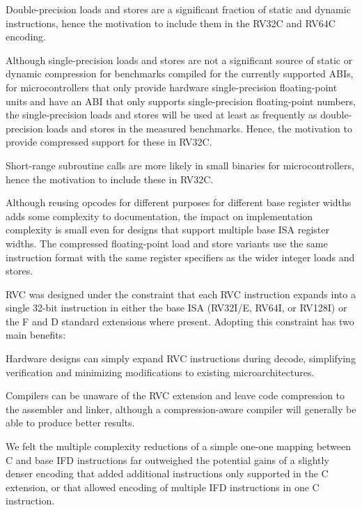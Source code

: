 \begin{commentary}
Double-precision loads and stores are a significant fraction of static
and dynamic instructions, hence the motivation to include them in the
RV32C and RV64C encoding.

Although single-precision loads and stores are not a significant
source of static or dynamic compression for benchmarks compiled for
the currently supported ABIs, for microcontrollers that only provide
hardware single-precision floating-point units and have an ABI that
only supports single-precision floating-point numbers, the
single-precision loads and stores will be used at least as frequently
as double-precision loads and stores in the measured benchmarks.
Hence, the motivation to provide compressed support for these in
RV32C.

Short-range subroutine calls are more likely in small binaries for
microcontrollers, hence the motivation to include these in RV32C.

Although reusing opcodes for different purposes for different base
register widths adds some complexity to documentation, the impact on
implementation complexity is small even for designs that support
multiple base ISA register widths.  The compressed floating-point load
and store variants use the same instruction format with the same
register specifiers as the wider integer loads and stores.
\end{commentary}

RVC was designed under the constraint that each RVC instruction
expands into a single 32-bit instruction in either the base ISA
(RV32I/E, RV64I, or RV128I) or the F and D standard extensions where
present.  Adopting this constraint has two main benefits:

\begin{tightlist}
\item Hardware designs can simply expand RVC instructions during
  decode, simplifying verification and minimizing modifications to
  existing microarchitectures.
\item Compilers can be unaware of the RVC extension and leave code
  compression to the assembler and linker, although a
  compression-aware compiler will generally be able to produce better
  results.
\end{tightlist}

\begin{commentary}
We felt the multiple complexity reductions of a simple one-one mapping
between C and base IFD instructions far outweighed the potential gains
of a slightly denser encoding that added additional instructions only
supported in the C extension, or that allowed encoding of multiple IFD
instructions in one C instruction.
\end{commentary}

